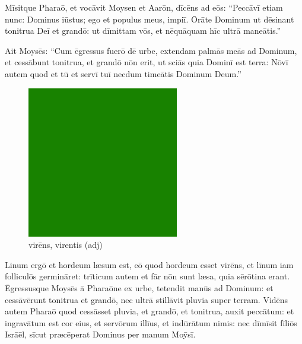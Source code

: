 Mīsitque Pharaō, et vocāvit Moysen et Aarōn,
dīcēns ad eōs: ``Peccāvī etiam nunc: Dominus iūstus; ego
et populus meus, impiī.  Ōrāte Dominum ut dēsinant
tonitrua Deī et grandō: ut dīmittam vōs, et nēquāquam hīc ultrā maneātis.''

Ait Moysēs: ``Cum ēgressus fuerō
dē urbe, extendam palmās meās ad Dominum, et cessābunt tonitrua, et grandō
nōn erit, ut sciās quia Dominī est terra: Nōvī autem quod et tū et
servī tuī necdum timeātis Dominum Deum.'' 

\begin{figure}[hp]
    \centering
    \includegraphics{green}
    \caption{virēns, virentis (adj)}
\end{figure}

Linum ergō et hordeum læsum est, eō quod
hordeum esset virēns, et līnum iam
folliculōs
germināret:  trīticum autem et
fār nōn sunt læsa, quia sērōtina erant. 
Ēgres\-susque Moysēs ā Pharaōne ex urbe, tetendit manūs ad Dominum: et
cessāvērunt tonitrua et grandō, nec ultrā stillāvit
pluvia super terram.  Vidēns autem Pharaō quod cessāsset
pluvia, et grandō, et tonitrua, auxit peccātum:  et
ingravātum est cor eius, et servōrum illīus, et indūrātum nimis: nec
dīmīsit fīliōs Isrāēl, sīcut præcēperat Dominus
per manum Moȳsī.
